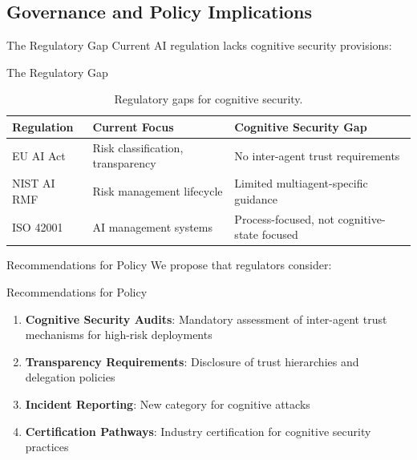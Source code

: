 \documentclass[
  ignorenonframetext,
]{beamer}
\begin{document}
\subsection{Governance and Policy Implications}\label{sec:governance}

\begin{frame}[allowframebreaks]{The Regulatory Gap}
\protect{}\label{the-regulatory-gap}
Current AI regulation lacks cognitive security provisions:

\end{frame}

\begin{frame}[allowframebreaks]{The Regulatory Gap}
\begin{table}[htbp]
\centering
\caption{Regulatory gaps for cognitive security.}
\label{tab:regulatory-gaps}
\begin{tabular}{@{}lp{4cm}p{4cm}@{}}
\toprule
Regulation & Current Focus & Cognitive Security Gap \\
\midrule
EU AI Act & Risk classification, transparency & No inter-agent trust requirements \\
NIST AI RMF & Risk management lifecycle & Limited multiagent-specific guidance \\
ISO 42001 & AI management systems & Process-focused, not cognitive-state focused \\
\bottomrule
\end{tabular}
\end{table}
\end{frame}

\begin{frame}[allowframebreaks]{Recommendations for Policy}
\protect{}\label{recommendations-for-policy}
We propose that regulators consider:

\end{frame}

\begin{frame}[allowframebreaks]{Recommendations for Policy}
\begin{enumerate}
\item \textbf{Cognitive Security Audits}: Mandatory assessment of inter-agent trust mechanisms for high-risk deployments
\item \textbf{Transparency Requirements}: Disclosure of trust hierarchies and delegation policies
\item \textbf{Incident Reporting}: New category for cognitive attacks
\item \textbf{Certification Pathways}: Industry certification for cognitive security practices
\end{enumerate}
\end{frame}
\end{document}
